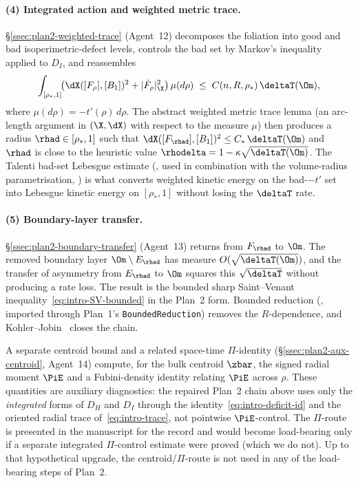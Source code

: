 \paragraph{(4) Integrated action and weighted metric trace.}
\S\ref{ssec:plan2-weighted-trace} (Agent~12) decomposes the foliation
into good and bad isoperimetric-defect levels, controls the bad set
by Markov's inequality applied to $D_I$, and reassembles
\[
   \int_{[\rho_*,1]}\!\bigl(\dX([F_\rho],[B_1])^2+|\dot F_\rho|_\X^2\bigr)\,\mu(d\rho)
   \;\le\;C(n,R,\rho_*)\,\deltaT(\Om),
\]
where $\mu(d\rho)=-t'(\rho)\,d\rho$. The abstract weighted metric trace
lemma (an arc-length argument in $(\X,\dX)$ with respect to the
measure $\mu$) then produces a radius $\rhad\in[\rho_*,1]$ such that
$\dX([F_{\rhad}],[B_1])^2\le C_*\,\deltaT(\Om)$ and $\rhad$ is close
to the heuristic value $\rhodelta=1-\kappa\sqrt{\deltaT(\Om)}$. The
Talenti bad-set Lebesgue estimate (\cite{Talenti1976}, used in
combination with the volume-radius parametrisation,
\cite[Thm~1.3.2]{Kesavan2006}) is what converts weighted kinetic
energy on the bad-$-t'$ set into Lebesgue kinetic energy on
$[\rho_*,1]$ without losing the $\deltaT$ rate.

\paragraph{(5) Boundary-layer transfer.}
\S\ref{ssec:plan2-boundary-transfer} (Agent~13) returns from $F_{\rhad}$ to
$\Om$. The removed boundary layer $\Om\setminus E_{\rhad}$ has
measure $O(\sqrt{\deltaT(\Om)})$, and the transfer of asymmetry from
$E_{\rhad}$ to $\Om$ squares this $\sqrt{\deltaT}$ without producing
a rate loss. The result is the bounded sharp Saint--Venant
inequality~\eqref{eq:intro-SV-bounded} in the Plan~2 form. Bounded
reduction (\cite[Lem.~5.3]{BDV}, imported through
Plan~1's \texttt{BoundedReduction}) removes the $R$-dependence, and
Kohler--Jobin~\cite{Brasco2014} closes the chain.

\begin{remark}\label{rem:intro-pi-route}
A separate centroid bound and a related space-time $\Pi$-identity
(\S\ref{ssec:plan2-aux-centroid}, Agent~14) compute, for the bulk
centroid $\zbar$, the signed radial moment
$\PiE$ and a Fubini-density identity relating
$\PiE$ across $\rho$. These quantities are auxiliary diagnostics:
the repaired Plan~2 chain above uses only the \emph{integrated}
forms of $D_H$ and $D_I$ through the
identity~\eqref{eq:intro-deficit-id} and the oriented radial trace
of~\eqref{eq:intro-trace}, not pointwise $\PiE$-control. The
$\Pi$-route is presented in the manuscript for the record and would
become load-bearing only if a separate integrated $\Pi$-control
estimate were proved (which we do not). Up to that hypothetical
upgrade, the centroid/$\Pi$-route is not used in any of the load-bearing
steps of Plan~2.
\end{remark}

